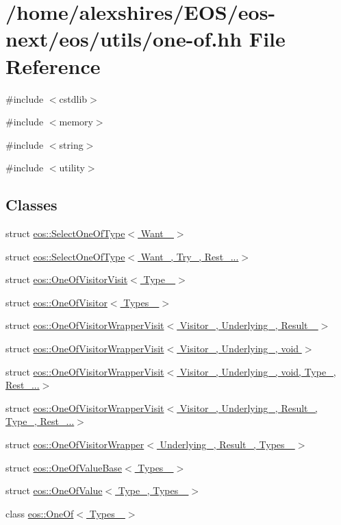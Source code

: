 \hypertarget{one-of_8hh}{
\section{/home/alexshires/EOS/eos-\/next/eos/utils/one-\/of.hh File Reference}
\label{one-of_8hh}
}
{\ttfamily \#include $<$cstdlib$>$}\par
{\ttfamily \#include $<$memory$>$}\par
{\ttfamily \#include $<$string$>$}\par
{\ttfamily \#include $<$utility$>$}\par
\subsection*{Classes}
\begin{DoxyCompactItemize}
\item 
struct \hyperlink{structeos_1_1SelectOneOfType_3_01Want___01_4}{eos::SelectOneOfType$<$ Want\_\- $>$}
\item 
struct \hyperlink{structeos_1_1SelectOneOfType_3_01Want___00_01Try___00_01Rest___8_8_8_4}{eos::SelectOneOfType$<$ Want\_\-, Try\_\-, Rest\_\-...$>$}
\item 
struct \hyperlink{structeos_1_1OneOfVisitorVisit}{eos::OneOfVisitorVisit$<$ Type\_\- $>$}
\item 
struct \hyperlink{structeos_1_1OneOfVisitor}{eos::OneOfVisitor$<$ Types\_\- $>$}
\item 
struct \hyperlink{structeos_1_1OneOfVisitorWrapperVisit_3_01Visitor___00_01Underlying___00_01Result___01_4}{eos::OneOfVisitorWrapperVisit$<$ Visitor\_\-, Underlying\_\-, Result\_\- $>$}
\item 
struct \hyperlink{structeos_1_1OneOfVisitorWrapperVisit_3_01Visitor___00_01Underlying___00_01void_01_4}{eos::OneOfVisitorWrapperVisit$<$ Visitor\_\-, Underlying\_\-, void $>$}
\item 
struct \hyperlink{structeos_1_1OneOfVisitorWrapperVisit_3_01Visitor___00_01Underlying___00_01void_00_01Type___00_01Rest___8_8_8_4}{eos::OneOfVisitorWrapperVisit$<$ Visitor\_\-, Underlying\_\-, void, Type\_\-, Rest\_\-...$>$}
\item 
struct \hyperlink{structeos_1_1OneOfVisitorWrapperVisit_3_01Visitor___00_01Underlying___00_01Result___00_01Type___00_01Rest___8_8_8_4}{eos::OneOfVisitorWrapperVisit$<$ Visitor\_\-, Underlying\_\-, Result\_\-, Type\_\-, Rest\_\-...$>$}
\item 
struct \hyperlink{structeos_1_1OneOfVisitorWrapper}{eos::OneOfVisitorWrapper$<$ Underlying\_\-, Result\_\-, Types\_\- $>$}
\item 
struct \hyperlink{structeos_1_1OneOfValueBase}{eos::OneOfValueBase$<$ Types\_\- $>$}
\item 
struct \hyperlink{structeos_1_1OneOfValue}{eos::OneOfValue$<$ Type\_\-, Types\_\- $>$}
\item 
class \hyperlink{classeos_1_1OneOf}{eos::OneOf$<$ Types\_\- $>$}
\end{DoxyCompactItemize}
